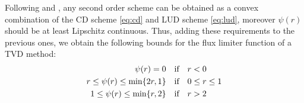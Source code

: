 Following \cite{tvd:sweeby} and \cite{tvd:vanleer}, any second order scheme 
can 
be obtained as a convex combination of the CD scheme \eqref{eq:cd} and LUD 
scheme \eqref{eq:lud}, moreover $\psi(r)$ should be at least Lipschitz 
continuous. Thus, adding these requirements to the previous ones, we obtain 
the 
following bounds for the flux limiter function of a TVD method:
\begin{align}
\psi(r) = 0 \quad &\text{if} \quad r < 0 \notag \\
\label{tvd:bounds} r \leq \psi(r) \leq \min \{2r, 1\} \quad &\text{if} \quad 0 
\leq r \leq 1\\
1 \leq \psi(r) \leq \min \{r, 2 \} \quad &\text{if} \quad r > 2 \notag
\end{align}
